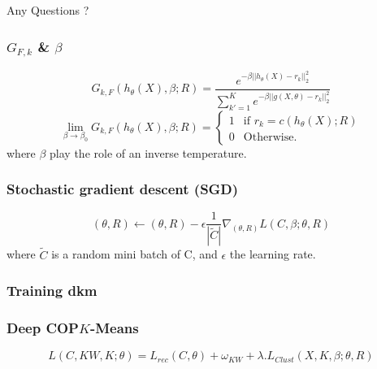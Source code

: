\documentclass{beamer}
\begin{document}
\begin{frame}
Any Questions ?
\end{frame}

\begin{frame}
\frametitle{$G_{F,k}$ \& $\beta$}
\begin{equation*}
G_{k, F}(h_{\theta}(X), \beta; R) = \frac{e^{-\beta ||h_\theta(X) - r_k||_2^2}}
{\sum_{k' = 1}^K e^{-\beta ||g(X, \theta) - r_k||_2^2}}
\end{equation*}
\begin{equation*}
  \lim\limits_{\beta \rightarrow \beta_0}G_{k, F}(h_\theta(X), \beta; R) = \left\{
\begin{array}{ll}
  1 & \mbox{if }r_k = c(h_\theta(X); R)\\
  0 & \mbox{Otherwise.}
\end{array}
\right.
\end{equation*}
where $\beta$ play the role of an inverse temperature.
\end{frame}

\begin{frame}
\frametitle{Stochastic gradient descent (SGD)}
\begin{equation*}
  (\theta, R) \gets (\theta, R) - \epsilon \frac{1}{|\widetilde{C}|}
  \nabla_{(\theta, R)} L(C, \beta; \theta, R)
\end{equation*}
where $\widetilde{C}$ is a random mini batch of C, and $\epsilon$ the
learning rate.
\end{frame}
\begin{frame}
\frametitle{Training dkm}
\end{frame}

\begin{frame}
\frametitle{Deep COP$K$-Means}
\begin{equation*}
  L( C, KW, K; \theta) = L_{rec}(C, \theta) + \omega_{KW} + \lambda.L_{Clust}(X, K, \beta;\theta, R)
\end{equation*}
\end{frame}
\end{document}
